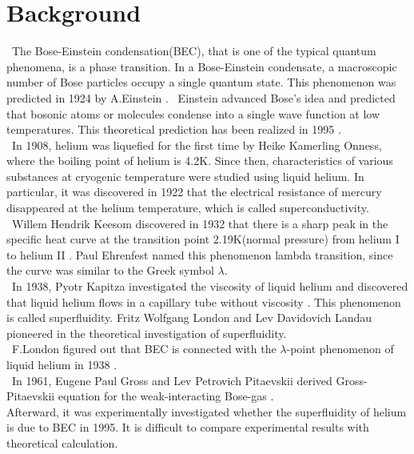 \documentclass[12pt,a4paper]{report} %
\begin{document}
\section{Background}
\ The Bose-Einstein condensation(BEC), that is one of the typical quantum phenomena,
is a phase transition.
In a Bose-Einstein condensate, a macroscopic number of
Bose particles occupy a single quantum state.
This phenomenon was predicted in 1924 by A.Einstein \cite{1} \cite{2}.
\ Einstein advanced Bose's idea and predicted that bosonic atoms or molecules
condense into a single wave function at low temperatures.
This theoretical prediction has been realized in 1995 \cite{3} \cite{4}.
\\
\ In 1908, helium was liquefied for the first time by Heike Kamerling Onness, 
where the boiling point of helium is 4.2K. 
Since then, characteristics of various substances at cryogenic temperature
were studied using liquid helium. 
In particular, it was discovered in 1922 that the electrical resistance of mercury
disappeared at the helium temperature, which is called superconductivity.
\\
\ Willem Hendrik Keesom discovered in 1932 that there is a sharp peak 
in the specific heat curve at the transition point 2.19K(normal pressure) 
from helium I to helium II \cite{5}. Paul Ehrenfest named this phenomenon lambda transition,
since the curve was similar to the Greek symbol $\lambda$.
\\
\ In 1938, Pyotr Kapitza investigated the viscosity of liquid helium and 
discovered that liquid helium flows in a capillary tube without viscosity \cite{6}.
This phenomenon is called superfluidity. Fritz Wolfgang London and Lev Davidovich Landau pioneered 
in the theoretical investigation of superfluidity.
\\
\ F.London figured out that BEC is connected with 
the $\lambda$-point phenomenon of liquid helium in 1938 \cite{7}.
\\
\ In 1961, Eugene Paul Gross and Lev Petrovich Pitaevskii derived Gross-Pitaevskii equation for the weak-interacting Bose-gas
\cite{8} \cite{9}.
\\ Afterward, it was experimentally investigated whether the superfluidity of helium is due to BEC in 1995\cite{10}\cite{11}\cite{12}.
It is difficult to compare experimental results with theoretical calculation. 
\end{document}
